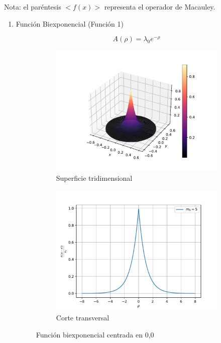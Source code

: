 Nota: el paréntesis $<f(x)>$ representa el operador de Macauley.
\begin{enumerate}
	\item Función Biexponencial (Función 1)

	\begin{equation}
		A(\rho)=\lambda_0e^{-\rho}
	\end{equation}
	\begin{figure}
	    \centering
	    \sffamily
	    \begin{subfigure}{0.45\textwidth}
	    \centering
	        \includegraphics[width=\textwidth]{figuras/biexp3d.pdf}
	        \caption{Superficie tridimensional}
	        \label{fig:biexponencial.3d}
	    \end{subfigure}
	    \begin{subfigure}{0.45\textwidth}
	    \centering
	        \includegraphics[width=\textwidth]{figuras/biexp2d.pdf}
	        \caption{Corte transversal}
	        \label{fig:biexponencial.2d}
	    \end{subfigure}
	    \caption{Función biexponencial centrada en 0,0}
	    \label{fig:biexponencial}
	\end{figure}


\end{enumerate}

